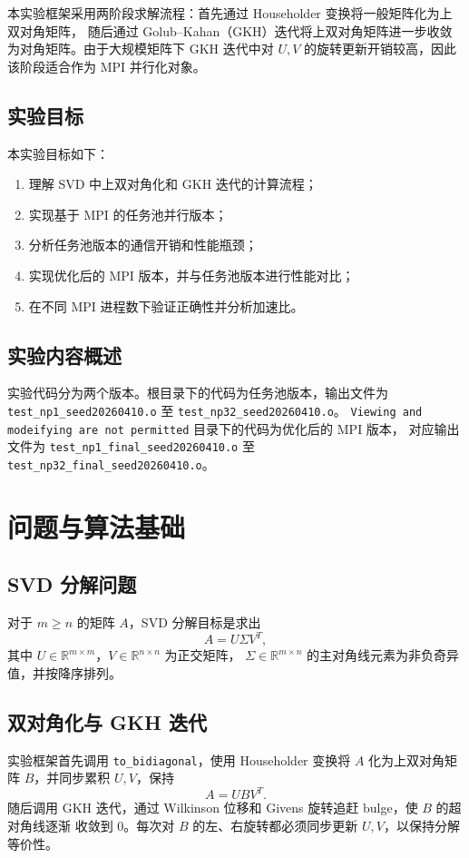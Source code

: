 \documentclass[UTF8,a4paper,10pt]{ctexart}
\begin{document}
本实验框架采用两阶段求解流程：首先通过 Householder 变换将一般矩阵化为上双对角矩阵，
随后通过 Golub--Kahan（GKH）迭代将上双对角矩阵进一步收敛为对角矩阵。由于大规模矩阵下
GKH 迭代中对 $U,V$ 的旋转更新开销较高，因此该阶段适合作为 MPI 并行化对象。

\subsection{实验目标}
本实验目标如下：
\begin{enumerate}
  \item 理解 SVD 中上双对角化和 GKH 迭代的计算流程；
  \item 实现基于 MPI 的任务池并行版本；
  \item 分析任务池版本的通信开销和性能瓶颈；
  \item 实现优化后的 MPI 版本，并与任务池版本进行性能对比；
  \item 在不同 MPI 进程数下验证正确性并分析加速比。
\end{enumerate}

\subsection{实验内容概述}
实验代码分为两个版本。根目录下的代码为任务池版本，输出文件为
\verb|test_np1_seed20260410.o| 至 \verb|test_np32_seed20260410.o|。
\verb|Viewing and modeifying are not permitted| 目录下的代码为优化后的 MPI 版本，
对应输出文件为 \verb|test_np1_final_seed20260410.o| 至
\verb|test_np32_final_seed20260410.o|。

\section{问题与算法基础}

\subsection{SVD 分解问题}
对于 $m\ge n$ 的矩阵 $A$，SVD 分解目标是求出
\[
  A = U \Sigma V^T,
\]
其中 $U\in\mathbb{R}^{m\times m}$，$V\in\mathbb{R}^{n\times n}$ 为正交矩阵，
$\Sigma\in\mathbb{R}^{m\times n}$ 的主对角线元素为非负奇异值，并按降序排列。

\subsection{双对角化与 GKH 迭代}
实验框架首先调用 \verb|to_bidiagonal|，使用 Householder 变换将 $A$ 化为上双对角矩阵
$B$，并同步累积 $U,V$，保持
\[
  A = U B V^T.
\]
随后调用 GKH 迭代，通过 Wilkinson 位移和 Givens 旋转追赶 bulge，使 $B$ 的超对角线逐渐
收敛到 0。每次对 $B$ 的左、右旋转都必须同步更新 $U,V$，以保持分解等价性。
\end{document}
